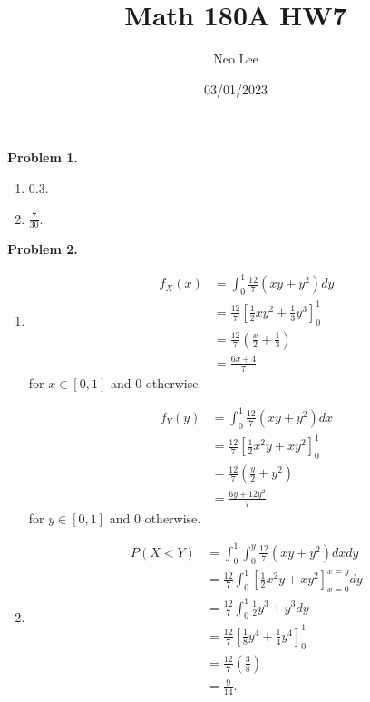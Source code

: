 \documentclass{article}
\title{Math 180A HW7}
\author{Neo Lee}
\date{03/01/2023}
\begin{document}
 

\maketitle 

\textbf{Problem 1.}
\begin{enumerate}[label={(\alph*)}]
    \item 0.3.
    \item $\frac{7}{30}$.
\end{enumerate}
\bigbreak

\textbf{Problem 2.}
\begin{enumerate}[label={(\alph*)}]
    \item 
    \begin{align}
        f_X(x) & = \int_{0}^{1} \frac{12}{7}(xy+y^2)dy \\
        & = \frac{12}{7}\left[\frac{1}{2}xy^2+\frac{1}{3}y^3\right]_0^1 \\
        & = \frac{12}{7}\left(\frac{x}{2}+\frac{1}{3}\right) \\
        & = \frac{6x+4}{7}
    \end{align}
    for $x \in [0,1]$ and 0 otherwise.

    \begin{align}
        f_Y(y) & = \int_{0}^{1} \frac{12}{7}(xy+y^2)dx \\
        & = \frac{12}{7}\left[\frac{1}{2}x^2y+xy^2\right]_0^1 \\
        & = \frac{12}{7}\left(\frac{y}{2}+y^2\right) \\
        & = \frac{6y + 12y^2}{7}
    \end{align}
    for $y \in [0,1]$ and 0 otherwise.

    \item 
    \begin{align}
        P(X<Y) & = \int_{0}^{1}\int_{0}^{y} \frac{12}{7}(xy+y^2)dxdy \\
        & = \frac{12}{7}\int_{0}^{1}\left[\frac{1}{2}x^2y+xy^2\right]_{x=0}^{x=y} dy \\
        & = \frac{12}{7}\int_{0}^{1} \frac{1}{2}y^3+y^3dy \\
        & = \frac{12}{7}\left[\frac{1}{8}y^4+\frac{1}{4}y^4\right]_0^1 \\
        & = \frac{12}{7}\left(\frac{3}{8}\right) \\
        & = \frac{9}{14}.
    \end{align}


\end{enumerate}
\end{document}
